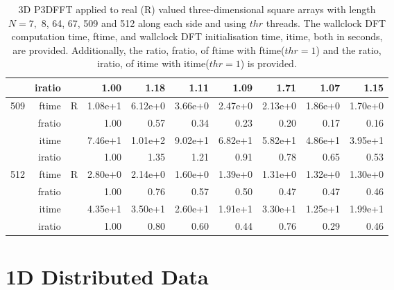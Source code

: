 \documentclass[a4paper]{article}
\begin{document}
\begin{table}[htbp]
\begin{center}
\begin{small}
\begin{tabular}{|r|r|r|r|r|r|r|r|r|r|}
     & iratio & &      1.00 &   1.18 &   1.11 &   1.09 &   1.71 &   1.07 &   1.15      \\ \hline 
  509  & ftime & R  &  1.08e+1 &   6.12e+0 &   3.66e+0 &   2.47e+0 &   2.13e+0 &   1.86e+0 &   1.70e+0    \\ 
      & fratio & &     1.00 &   0.57 &   0.34 &   0.23 &   0.20 &   0.17 &   0.16        \\ 
     & itime & &       7.46e+1 &   1.01e+2 &  9.02e+1  &   6.82e+1 &   5.82e+1 &   4.86e+1 &   3.95e+1       \\ 
     & iratio & &      1.00 &   1.35 &   1.21 &   0.91 &   0.78 &   0.65 &   0.53         \\ \hline 
  512  & ftime & R  &  2.80e+0 &   2.14e+0 &   1.60e+0 &   1.39e+0 &   1.31e+0 &   1.32e+0 &   1.30e+0     \\ 
      & fratio & &     1.00 &   0.76 &   0.57 &   0.50 &   0.47 &   0.47 &   0.46     \\ 
     & itime & &       4.35e+1 &   3.50e+1 &   2.60e+1 &   1.91e+1 &   3.30e+1 &   1.25e+1 &   1.99e+1        \\ 
     & iratio & &      1.00 &   0.80 &   0.60 &   0.44 &   0.76 &   0.29 &   0.46        \\ \hline
\end{tabular}
\caption{3D P3DFFT applied to real (R) valued three-dimensional square arrays with length
  $N=7,$ 8, 64, 67, 509 and 512 along each side and using $thr$ threads. The wallclock DFT computation time,
  ftime, and wallclock DFT initialisation time, itime, both in seconds, are provided. Additionally,  the ratio,
  fratio, of ftime  with ftime($thr=1$) and the ratio, iratio, of itime  with itime($thr=1$) is provided. }\label{Tbl:P3DFFT3d}
\end{small}
\end{center}
\end{table}


\clearpage

\section{1D Distributed Data}\label{App:1Ddist}
\end{document}
